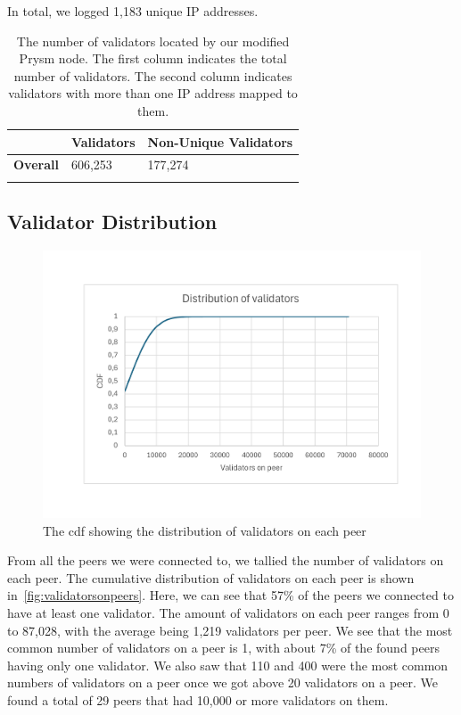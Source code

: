 In total, we logged 1,183 unique IP addresses.


\begin{table}[]
    \centering
    \caption{The number of validators located by our modified Prysm node. The first column indicates the total number of validators. The second column indicates validators with more than one IP address mapped to them.}
    \begin{tabular}{lll}
        \hline
        & \textbf{Validators} & \textbf{Non-Unique Validators} \\ \hline
        \textbf{Overall} & 606,253             & 177,274                        \\ \hline
        \\
    \end{tabular}
    \label{tab:unique vals}
\end{table}

\subsection{Validator Distribution}\label{subsec:validator-distribution}
\begin{figure}[!ht]
    \centering
    \includegraphics[scale = 0.45]{figures/distvalrerun}
    \caption{The cdf showing the distribution of validators on each peer}
    \label{fig:validatorsonpeers}
\end{figure}
From all the peers we were connected to, we tallied the number of validators on each peer.
The cumulative distribution of validators on each peer is shown in~\autoref{fig:validatorsonpeers}.
Here, we can see that 57\% of the peers we connected to have at least one validator.
The amount of validators on each peer ranges from 0 to 87,028, with the average being 1,219 validators per peer.
We see that the most common number of validators on a peer is 1, with about 7\% of the found peers having only one validator.
We also saw that 110 and 400 were the most common numbers of validators on a peer once we got above 20 validators on a peer.
We found a total of 29 peers that had 10,000 or more validators on them.